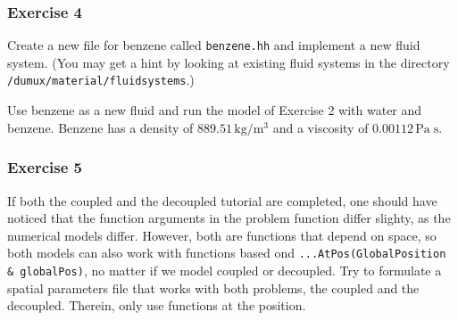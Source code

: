 \subsubsection{Exercise 4}
Create a new file for benzene called \texttt{benzene.hh} and implement
a new fluid system. (You may get a hint by looking at existing fluid 
systems in the directory \verb+/dumux/material/fluidsystems+.)

Use benzene as a new fluid and run the model of Exercise 2 with water
and benzene. Benzene has a density of $889.51 \, \text{kg} / \text{m}^3$
and a viscosity of $0.00112 \, \text{Pa} \; \text{s}$. 


\subsubsection{Exercise 5}
If both the coupled and the decoupled tutorial are completed, one should have noticed that the function arguments in the problem function differ slighty, as the numerical models differ. However, both are functions that depend on space, so both models can also work with functions based ond \mbox{\texttt{...AtPos(GlobalPosition \& globalPos)}}, no matter if we model coupled or decoupled. Try to formulate a spatial parameters file that works with both problems, the coupled and the decoupled. Therein, only use functions at the position.

